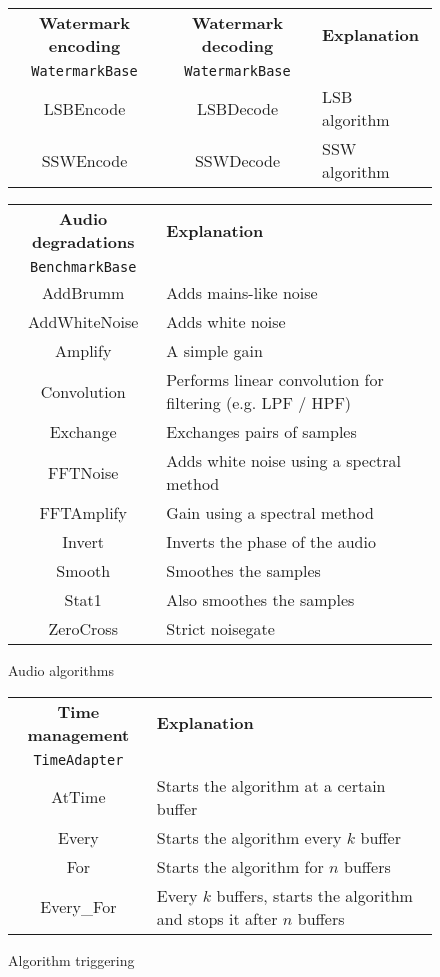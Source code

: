 \begin{figure}[h!]
\centering
\begin{tabular}{|c|c|l|}
\hline
\textbf{Watermark encoding} & \textbf{Watermark decoding} & \textbf{Explanation} \\
\texttt{WatermarkBase} & \texttt{WatermarkBase} & \\
\hline
LSBEncode & LSBDecode & LSB algorithm \\
SSWEncode & SSWDecode & SSW algorithm \\
\hline
\end{tabular}

\vspace{1em}

\begin{tabular}{|c|l|}
\hline
\textbf{Audio degradations} & \textbf{Explanation} \\
\texttt{BenchmarkBase} & \\
\hline
AddBrumm & Adds mains-like noise \\
AddWhiteNoise & Adds white noise \\
Amplify & A simple gain \\
Convolution & Performs linear convolution for filtering (e.g. LPF / HPF)\\
Exchange & Exchanges pairs of samples \\
FFTNoise & Adds white noise using a spectral method \\
FFTAmplify & Gain using a spectral method \\
Invert & Inverts the phase of the audio \\
Smooth & Smoothes the samples \\ 
Stat1 & Also smoothes the samples \\
ZeroCross & Strict noisegate\\
\hline
\end{tabular} 
\caption{Audio algorithms}
\label{frameworkclass2}
\end{figure}

\begin{figure}[h!]
\centering
\begin{tabular}{|c|l|}
\hline
\textbf{Time management} & \textbf{Explanation} \\
\texttt{TimeAdapter} & \\
\hline
AtTime & Starts the algorithm at a certain buffer \\
Every & Starts the algorithm every $k$ buffer \\
For & Starts the algorithm for $n$ buffers \\
Every\_For & Every $k$ buffers, starts the algorithm and stops it after $n$ buffers\\
\hline
\end{tabular}
\caption{Algorithm triggering}
\label{frameworkclass3}
\end{figure}

